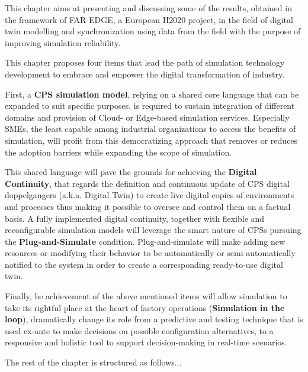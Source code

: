 This chapter aims at presenting and discussing some of the results, obtained in the framework of FAR-EDGE, a European H2020 project, in the field of digital twin modelling and synchronization using data from the field with the purpose of improving simulation reliability. 

This chapter proposes four items that lead the path of simulation technology development to embrace and empower the digital transformation of industry. 

First, a \textbf{CPS simulation model}, relying on a shared core language that can be expanded to suit specific purposes, is required to sustain integration of different domains and provision of Cloud- or Edge-based simulation services. 
Especially SMEs, the least capable among industrial organizations to access the benefits of simulation, will profit from this democratizing approach that removes or reduces the adoption barriers while expanding the scope of simulation.

This shared language will pave the grounds for achieving the \textbf{Digital Continuity}, that regards the definition and continuous update of CPS digital doppelgangers (a.k.a. Digital Twin) to create live digital copies of  environments and processes thus making it possible to oversee and control them on a factual basis.  A fully implemented digital continuity, together with flexible and reconfigurable simulation models will leverage the smart nature of CPSs pursuing the \textbf{Plug-and-Simulate} condition. Plug-and-simulate will make adding new resources or modifying their behavior to be automatically or semi-automatically notified to the system in order to create a corresponding ready-to-use digital twin.

Finally, he achievement of the above mentioned items will allow simulation to take its rightful place at the heart of factory operations (\textbf{Simulation in the loop}),  dramatically change its role from a predictive and testing technique that is used ex-ante to make decisions on possible configuration alternatives, to a responsive and holistic tool to support decision-making in real-time scenarios.



The rest of the chapter is structured as follows...







